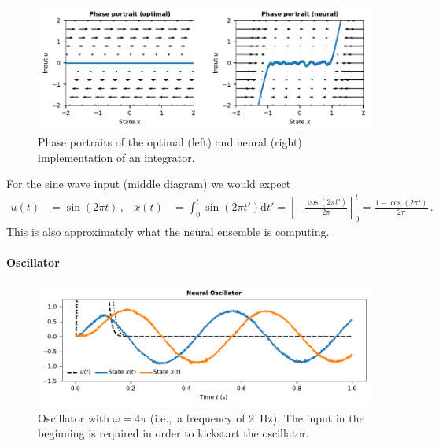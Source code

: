 \documentclass[10pt,letterpaper,oneside]{article}
\begin{document}
\begin{figure}
	\centering
	\includegraphics{media/example_integrator_phases.pdf}
	\caption{Phase portraits of the optimal (left) and neural (right) implementation of an integrator. }
	\label{fig:example_integrator_phases}
\end{figure}

For the sine wave input (middle diagram) we would expect
\begin{align*}
	u(t) &= \sin(2 \pi t) \,, &
	x(t) &= \int_{0}^t \sin(2 \pi t') \mathrm{d}t' = \left[ -\frac{\cos(2 \pi t')}{2 \pi}  \right]_0^t = \frac{1 - \cos(2 \pi t)}{2 \pi} \,.
\end{align*}
This is also approximately what the neural ensemble is computing.

\paragraph{Oscillator}

\begin{figure}
	\centering
	\includegraphics{media/example_oscillator.pdf}
	\caption{Oscillator with $\omega = 4\pi$ (i.e.,~a frequency of \SI{2}{\hertz}). The input in the beginning is required in order to kickstart the oscillator. }
	\label{fig:example_oscillator}
\end{figure}
\end{document}
